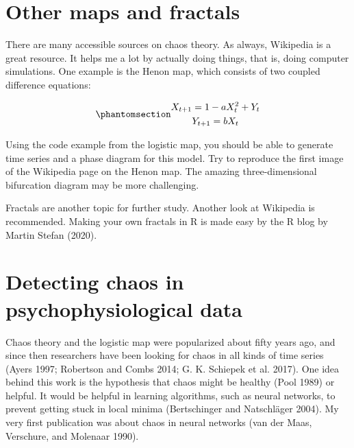 \documentclass[
  a4paper,
  DIV=11,
  numbers=noendperiod,
  oneside]{scrreprt}
\begin{document}
\section{Other maps and fractals}\label{sec-Other-maps-and-fractals}

There are many accessible sources on chaos theory. As always, Wikipedia
is a great resource. It helps me a lot by actually doing things, that
is, doing computer simulations. One example is the Henon map, which
consists of two coupled difference equations:

\begin{equation}\phantomsection\label{eq-ch2-4}{
\begin{gathered}
X_{t + 1} = 1 - aX_{t}^{2} + Y_{t} \\
Y_{t + 1} = bX_{t} 
\end{gathered}
}\end{equation}

Using the code example from the logistic map, you should be able to
generate time series and a phase diagram for this model. Try to
reproduce the first image of the Wikipedia page on the Henon map. The
amazing three-dimensional bifurcation diagram may be more challenging.

Fractals are another topic for further study. Another look at Wikipedia
is recommended. Making your own fractals in R is made easy by the R blog
by Martin Stefan (2020).

\section{Detecting chaos in psychophysiological
data}\label{sec-Detecting-chaos-in-psychophysiological-data}

Chaos theory and the logistic map were popularized about fifty years
ago, and since then researchers have been looking for chaos in all kinds
of time series (Ayers 1997; Robertson and Combs 2014; G. K. Schiepek et
al. 2017). One idea behind this work is the hypothesis that chaos might
be healthy (Pool 1989) or helpful. It would be helpful in learning
algorithms, such as neural networks, to prevent getting stuck in local
minima (Bertschinger and Natschläger 2004). My very first publication
was about chaos in neural networks (van der Maas, Verschure, and
Molenaar 1990).
\end{document}
